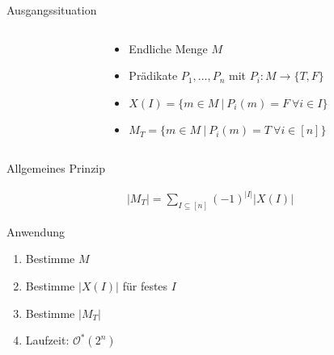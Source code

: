 \documentclass[table,german,10pt]{beamer}
\begin{document}
\begin{frame}{Ausgangssituation}
\begin{columns}
\begin{column}{5.5cm}
{      
      }
    \end{column}
    \begin{column}{7cm}
      \begin{itemize}[<+->]
      \item Endliche Menge $M$
      \item Prädikate $P_{1},\ldots,P_{n}$ mit $P_{i}:M\to \{T,F\}$
      \item $X(I)=\{m\in M\ |\ P_{i}(m)=F\ \forall i\in I\}$
      \item $M_{T}=\{m\in M\ |\ P_{i}(m)=T\ \forall i\in [n]\}$
      \end{itemize}
    \end{column}
  \end{columns}
\end{frame}
\begin{frame}{Allgemeines Prinzip}
  \begin{theorem}
    \begin{align*}
      |M_{T}|=\sum_{I\subseteq [n]}(-1)^{|I|}|X(I)|
    \end{align*}
  \end{theorem}
  \pause
  \begin{block}{Anwendung}
    \begin{enumerate}[<+->]
    \item Bestimme $M$
    \item Bestimme $|X(I)|$ für festes $I$
    \item Bestimme $|M_{T}|$
    \item Laufzeit: $\mathcal{O}^{*}(2^{n})$
    \end{enumerate}
  \end{block}
\end{frame}
\end{document}
